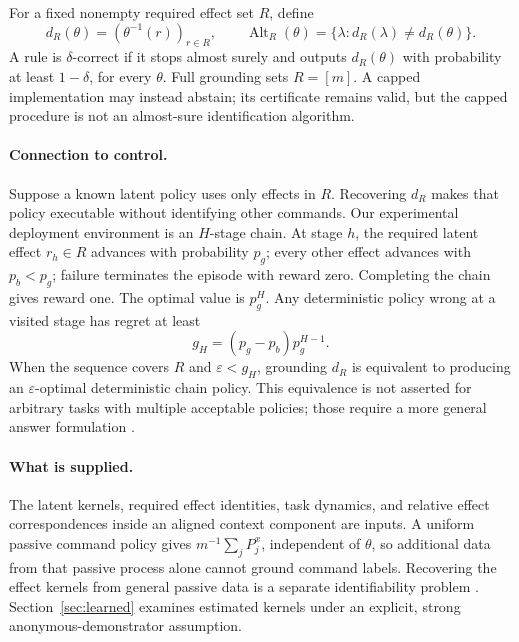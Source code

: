 \documentclass{article}
\newcommand{\Alt}{\operatorname{Alt}}
\begin{document}
For a fixed nonempty required effect set $R$, define
\begin{equation}
d_R(\theta)=(\theta^{-1}(r))_{r\in R},\qquad
\Alt_R(\theta)=\{\lambda:d_R(\lambda)\ne d_R(\theta)\}. \label{eq:answer}
\end{equation}
A rule is $\delta$-correct if it stops almost surely and outputs $d_R(\theta)$ with probability at least $1-\delta$, for every $\theta$. Full grounding sets $R=[m]$. A capped implementation may instead abstain; its certificate remains valid, but the capped procedure is not an almost-sure identification algorithm.

\paragraph{Connection to control.}
Suppose a known latent policy uses only effects in $R$. Recovering $d_R$ makes that policy executable without identifying other commands. Our experimental deployment environment is an $H$-stage chain. At stage $h$, the required latent effect $r_h\in R$ advances with probability $p_g$; every other effect advances with $p_b<p_g$; failure terminates the episode with reward zero. Completing the chain gives reward one. The optimal value is $p_g^H$. Any deterministic policy wrong at a visited stage has regret at least
\begin{equation}
g_H=(p_g-p_b)p_g^{H-1}. \label{eq:gap}
\end{equation}
When the sequence covers $R$ and $\varepsilon<g_H$, grounding $d_R$ is equivalent to producing an $\varepsilon$-optimal deterministic chain policy. This equivalence is not asserted for arbitrary tasks with multiple acceptable policies; those require a more general answer formulation \citep{degenne2019}.

\paragraph{What is supplied.}
The latent kernels, required effect identities, task dynamics, and relative effect correspondences inside an aligned context component are inputs. A uniform passive command policy gives $m^{-1}\sum_jP_j^x$, independent of $\theta$, so additional data from that passive process alone cannot ground command labels. Recovering the effect kernels from general passive data is a separate identifiability problem \citep{schur2026,nikulin2025}. Section~\ref{sec:learned} examines estimated kernels under an explicit, strong anonymous-demonstrator assumption.
\end{document}

